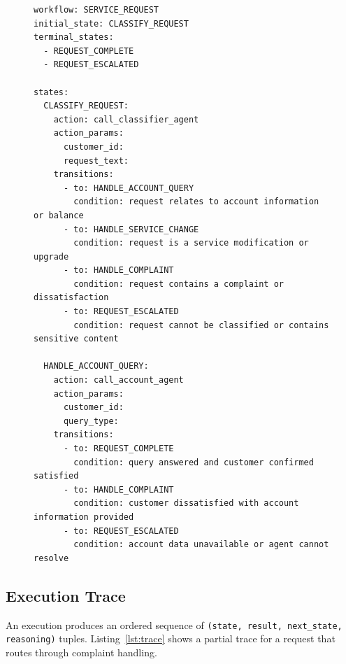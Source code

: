 \documentclass[10pt,conference]{IEEEtran}
\begin{document}
\begin{figure}[b]
\begin{tcolorbox}[codebox, title={Listing 1: Service request routing workflow (partial).}]
\begin{lstlisting}[style=yaml]
workflow: SERVICE_REQUEST
initial_state: CLASSIFY_REQUEST
terminal_states:
  - REQUEST_COMPLETE
  - REQUEST_ESCALATED

states:
  CLASSIFY_REQUEST:
    action: call_classifier_agent
    action_params:
      customer_id:
      request_text:
    transitions:
      - to: HANDLE_ACCOUNT_QUERY
        condition: request relates to account information or balance
      - to: HANDLE_SERVICE_CHANGE
        condition: request is a service modification or upgrade
      - to: HANDLE_COMPLAINT
        condition: request contains a complaint or dissatisfaction
      - to: REQUEST_ESCALATED
        condition: request cannot be classified or contains sensitive content

  HANDLE_ACCOUNT_QUERY:
    action: call_account_agent
    action_params:
      customer_id:
      query_type:
    transitions:
      - to: REQUEST_COMPLETE
        condition: query answered and customer confirmed satisfied
      - to: HANDLE_COMPLAINT
        condition: customer dissatisfied with account information provided
      - to: REQUEST_ESCALATED
        condition: account data unavailable or agent cannot resolve
\end{lstlisting}
\end{tcolorbox}
\label{lst:yaml}
\end{figure}

\subsection{Execution Trace}

An execution produces an ordered sequence of
\texttt{(state, result, next\_state, reasoning)} tuples.
Listing~\ref{lst:trace} shows a partial trace for a request
that routes through complaint handling.
\end{document}
